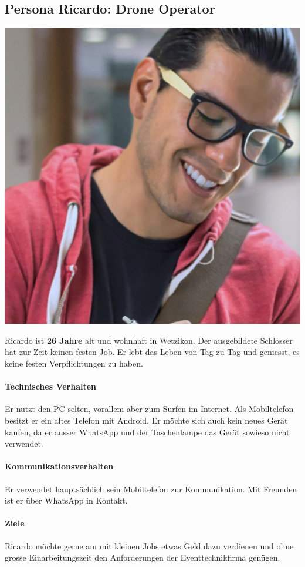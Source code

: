 \subsection{Persona Ricardo: Drone Operator}
\begin{minipage}{0.25\textwidth}
\centering
	\includegraphics[width=1\textwidth]{images/persona-ricardo.jpg}
	\label{fig:ricardo}
\end{minipage}
\hfill %
\begin{minipage}{0.70\textwidth}
Ricardo ist \textbf{26 Jahre} alt und wohnhaft in Wetzikon. Der ausgebildete Schlosser hat zur Zeit keinen festen Job. Er lebt das Leben von Tag zu Tag und geniesst, es keine festen Verpflichtungen zu haben.
\paragraph{Technisches Verhalten}
Er nutzt den PC selten, vorallem aber zum Surfen im Internet. Als Mobiltelefon besitzt er ein altes Telefon mit Android. Er möchte sich auch kein neues Gerät kaufen, da er ausser WhatsApp und der Taschenlampe das Gerät sowieso nicht verwendet.
\paragraph{Kommunikationsverhalten}
Er verwendet hauptsächlich sein Mobiltelefon zur Kommunikation. Mit Freunden ist er über WhatsApp in Kontakt.
\paragraph{Ziele}
Ricardo möchte gerne am mit kleinen Jobs etwas Geld dazu verdienen und ohne grosse Einarbeitungszeit den Anforderungen der Eventtechnikfirma genügen.
\end{minipage}

